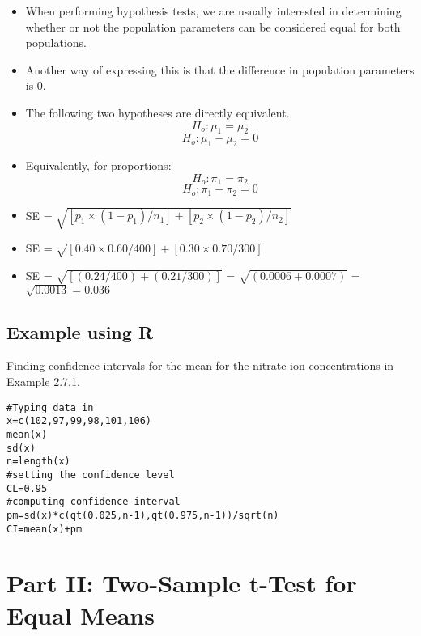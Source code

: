 \documentclass[]{report}
\begin{document}
\begin{itemize}
\item When performing hypothesis tests, we are usually interested in determining whether or not the population parameters can be considered equal for both populations.
\item Another way of expressing this is that the difference in population parameters is 0. 
\item The following two hypotheses are directly equivalent.
\[ H_o :  \mu_1 = \mu_2\]
\[ H_o :  \mu_1 - \mu_2 =0\]
\item Equivalently, for proportions:
\[ H_o :  \pi_1 = \pi_2\]
\[ H_o :  \pi_1 - \pi_2 =0\]
\end{itemize}


\begin{itemize}
\item SE = $\sqrt{ [p_1 \times (1 - p_1) / n_1] + [p_2 \times (1 - p_2) / n_2] } $
\item SE = $\sqrt{ [0.40 \times 0.60 / 400] + [0.30 \times 0.70 / 300] } $
\item SE  = $\sqrt{[ (0.24 / 400) + (0.21 / 300) ]}$ = $\sqrt{(0.0006 + 0.0007)}$ = $\sqrt{0.0013} = 0.036$
\end{itemize}


\subsection{Example using R}
Finding confidence intervals for the mean for the nitrate ion
concentrations in Example 2.7.1.
\begin{verbatim}
#Typing data in
x=c(102,97,99,98,101,106)
mean(x)
sd(x)
n=length(x)
#setting the confidence level
CL=0.95
#computing confidence interval
pm=sd(x)*c(qt(0.025,n-1),qt(0.975,n-1))/sqrt(n)
CI=mean(x)+pm
\end{verbatim}





\section{Part II: Two-Sample t-Test for Equal Means}
\end{document}
